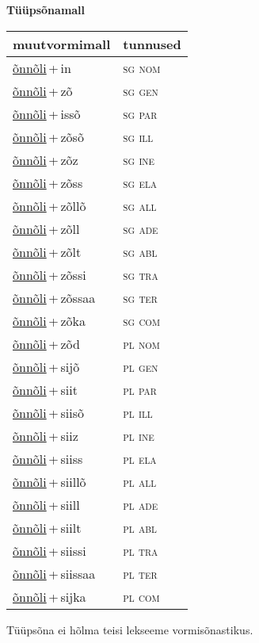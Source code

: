
\vspace{1.8em}
\begin{minipage}{\textwidth}
\textbf{Tüüpsõnamall \,}\\

\begin{sideways}
\begin{tabular}{l l}
muutvormimall & tunnused \\
\hline
\underline{õnnõli}\,+\,in & \textsc{ sg nom } \\
\underline{õnnõli}\,+\,zõ & \textsc{ sg gen } \\
\underline{õnnõli}\,+\,issõ & \textsc{ sg par } \\
\underline{õnnõli}\,+\,zõsõ & \textsc{ sg ill } \\
\underline{õnnõli}\,+\,zõz & \textsc{ sg ine } \\
\underline{õnnõli}\,+\,zõss & \textsc{ sg ela } \\
\underline{õnnõli}\,+\,zõllõ & \textsc{ sg all } \\
\underline{õnnõli}\,+\,zõll & \textsc{ sg ade } \\
\underline{õnnõli}\,+\,zõlt & \textsc{ sg abl } \\
\underline{õnnõli}\,+\,zõssi & \textsc{ sg tra } \\
\underline{õnnõli}\,+\,zõssaa & \textsc{ sg ter } \\
\underline{õnnõli}\,+\,zõka & \textsc{ sg com } \\
\underline{õnnõli}\,+\,zõd & \textsc{ pl nom } \\
\underline{õnnõli}\,+\,sijõ & \textsc{ pl gen } \\
\underline{õnnõli}\,+\,siit & \textsc{ pl par } \\
\underline{õnnõli}\,+\,siisõ & \textsc{ pl ill } \\
\underline{õnnõli}\,+\,siiz & \textsc{ pl ine } \\
\underline{õnnõli}\,+\,siiss & \textsc{ pl ela } \\
\underline{õnnõli}\,+\,siillõ & \textsc{ pl all } \\
\underline{õnnõli}\,+\,siill & \textsc{ pl ade } \\
\underline{õnnõli}\,+\,siilt & \textsc{ pl abl } \\
\underline{õnnõli}\,+\,siissi & \textsc{ pl tra } \\
\underline{õnnõli}\,+\,siissaa & \textsc{ pl ter } \\
\underline{õnnõli}\,+\,sijka & \textsc{ pl com } \\
\end{tabular}
\end{sideways}
\label{tab:tüüpsõnamall-õnnõliin}

\end{minipage}

 
\vspace{1em}
\noindent Tüüpsõna ei hõlma teisi lekseeme vormi\-sõnastikus.
